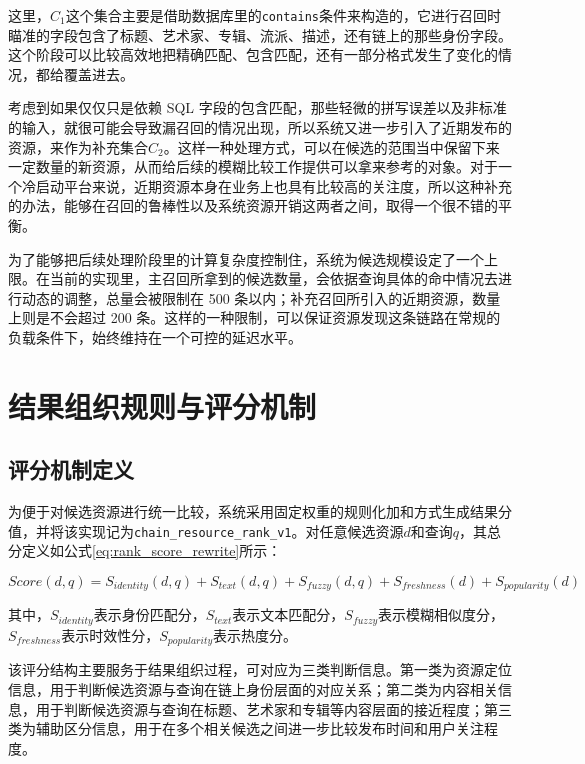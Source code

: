 这里，$C_1$这个集合主要是借助数据库里的\texttt{contains}条件来构造的，它进行召回时瞄准的字段包含了标题、艺术家、专辑、流派、描述，还有链上的那些身份字段。这个阶段可以比较高效地把精确匹配、包含匹配，还有一部分格式发生了变化的情况，都给覆盖进去。

考虑到如果仅仅只是依赖 SQL 字段的包含匹配，那些轻微的拼写误差以及非标准的输入，就很可能会导致漏召回的情况出现，所以系统又进一步引入了近期发布的资源，来作为补充集合$C_2$。这样一种处理方式，可以在候选的范围当中保留下来一定数量的新资源，从而给后续的模糊比较工作提供可以拿来参考的对象。对于一个冷启动平台来说，近期资源本身在业务上也具有比较高的关注度，所以这种补充的办法，能够在召回的鲁棒性以及系统资源开销这两者之间，取得一个很不错的平衡。

为了能够把后续处理阶段里的计算复杂度控制住，系统为候选规模设定了一个上限。在当前的实现里，主召回所拿到的候选数量，会依据查询具体的命中情况去进行动态的调整，总量会被限制在 500 条以内；补充召回所引入的近期资源，数量上则是不会超过 200 条。这样的一种限制，可以保证资源发现这条链路在常规的负载条件下，始终维持在一个可控的延迟水平。


\section{结果组织规则与评分机制}

\subsection{评分机制定义}

为便于对候选资源进行统一比较，系统采用固定权重的规则化加和方式生成结果分值，并将该实现记为\texttt{chain\_resource\_rank\_v1}。对任意候选资源$d$和查询$q$，其总分定义如公式\eqref{eq:rank_score_rewrite}所示：

\begin{equation}
    Score(d,q)=S_{identity}(d,q)+S_{text}(d,q)+S_{fuzzy}(d,q)+S_{freshness}(d)+S_{popularity}(d)
    \label{eq:rank_score_rewrite}
\end{equation}

其中，$S_{identity}$表示身份匹配分，$S_{text}$表示文本匹配分，$S_{fuzzy}$表示模糊相似度分，$S_{freshness}$表示时效性分，$S_{popularity}$表示热度分。

该评分结构主要服务于结果组织过程，可对应为三类判断信息。第一类为资源定位信息，用于判断候选资源与查询在链上身份层面的对应关系；第二类为内容相关信息，用于判断候选资源与查询在标题、艺术家和专辑等内容层面的接近程度；第三类为辅助区分信息，用于在多个相关候选之间进一步比较发布时间和用户关注程度。


